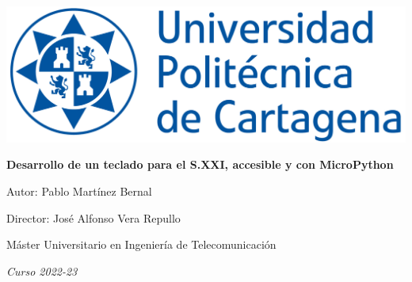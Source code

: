 \begin{titlepage}
    \vspace{5cm}
    {\centering
        \hspace{3cm}\includegraphics[width=.7\textwidth]{images/UPCT-front.jpg}
        
        \vspace{5cm}
        \hspace{2cm}\huge\textbf{\color{RoyalBlue}Desarrollo de un teclado para el S.XXI, accesible y con MicroPython} 
        
        {\LARGE
        \vspace*{\fill}
        \begin{flushright}
          \item Autor: Pablo Martínez Bernal
          \item Director: José Alfonso Vera Repullo 
          \item Máster Universitario en Ingeniería de Telecomunicación
          \item \textit{Curso 2022-23}   
        \end{flushright}
        }
    }
\end{titlepage}
